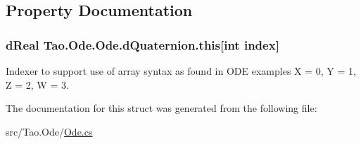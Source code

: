 \subsection{Property Documentation}
\hypertarget{struct_tao_1_1_ode_1_1_ode_1_1d_quaternion_aa30646d67eeb414c79e95ccf6bf29e97}{
\subsubsection[{this}]{\setlength{\rightskip}{0pt plus 5cm}dReal Tao.Ode.Ode.dQuaternion.this\mbox{[}int index\mbox{]}}}
\label{struct_tao_1_1_ode_1_1_ode_1_1d_quaternion_aa30646d67eeb414c79e95ccf6bf29e97}


Indexer to support use of array syntax as found in ODE examples X = 0, Y = 1, Z = 2, W = 3. 



The documentation for this struct was generated from the following file:\begin{DoxyCompactItemize}
\item 
src/Tao.Ode/\hyperlink{_ode_8cs}{Ode.cs}\end{DoxyCompactItemize}
